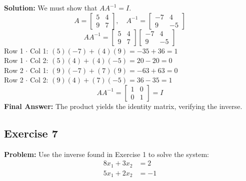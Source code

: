 \documentclass[11pt]{article}
\begin{document}
\textbf{Solution:}
We must show that $A A^{-1} = I$.
\[ A = \begin{bmatrix} 5 & 4 \\ 9 & 7 \end{bmatrix}, \quad A^{-1} = \begin{bmatrix} -7 & 4 \\ 9 & -5 \end{bmatrix} \]
\[ A A^{-1} = \begin{bmatrix} 5 & 4 \\ 9 & 7 \end{bmatrix} \begin{bmatrix} -7 & 4 \\ 9 & -5 \end{bmatrix} \]
Row 1 $\cdot$ Col 1: $(5)(-7) + (4)(9) = -35 + 36 = 1$ \\
Row 1 $\cdot$ Col 2: $(5)(4) + (4)(-5) = 20 - 20 = 0$ \\
Row 2 $\cdot$ Col 1: $(9)(-7) + (7)(9) = -63 + 63 = 0$ \\
Row 2 $\cdot$ Col 2: $(9)(4) + (7)(-5) = 36 - 35 = 1$
\[ A A^{-1} = \begin{bmatrix} 1 & 0 \\ 0 & 1 \end{bmatrix} = I \]
\textbf{Final Answer:} The product yields the identity matrix, verifying the inverse.

\subsection{Exercise 7}
\textbf{Problem:} Use the inverse found in Exercise 1 to solve the system:
\begin{align*}
    8x_1 + 3x_2 &= 2 \\
    5x_1 + 2x_2 &= -1
\end{align*}
\end{document}
